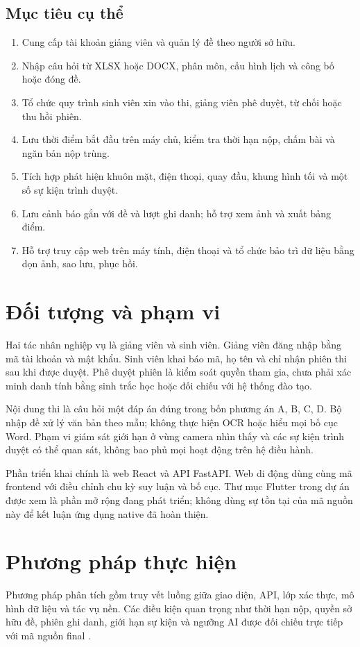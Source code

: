 \subsection{Mục tiêu cụ thể}
\begin{enumerate}
\item Cung cấp tài khoản giảng viên và quản lý đề theo người sở hữu.
\item Nhập câu hỏi từ XLSX hoặc DOCX, phân môn, cấu hình lịch và công bố hoặc đóng đề.
\item Tổ chức quy trình sinh viên xin vào thi, giảng viên phê duyệt, từ chối hoặc thu hồi phiên.
\item Lưu thời điểm bắt đầu trên máy chủ, kiểm tra thời hạn nộp, chấm bài và ngăn bản nộp trùng.
\item Tích hợp phát hiện khuôn mặt, điện thoại, quay đầu, khung hình tối và một số sự kiện trình duyệt.
\item Lưu cảnh báo gắn với đề và lượt ghi danh; hỗ trợ xem ảnh và xuất bảng điểm.
\item Hỗ trợ truy cập web trên máy tính, điện thoại và tổ chức bảo trì dữ liệu bằng dọn ảnh, sao lưu, phục hồi.
\end{enumerate}

\section{Đối tượng và phạm vi}
Hai tác nhân nghiệp vụ là giảng viên và sinh viên. Giảng viên đăng nhập bằng mã tài khoản và mật khẩu. Sinh viên khai báo mã, họ tên và chỉ nhận phiên thi sau khi được duyệt. Phê duyệt phiên là kiểm soát quyền tham gia, chưa phải xác minh danh tính bằng sinh trắc học hoặc đối chiếu với hệ thống đào tạo.

Nội dung thi là câu hỏi một đáp án đúng trong bốn phương án A, B, C, D. Bộ nhập đề xử lý văn bản theo mẫu; không thực hiện OCR hoặc hiểu mọi bố cục Word. Phạm vi giám sát giới hạn ở vùng camera nhìn thấy và các sự kiện trình duyệt có thể quan sát, không bao phủ mọi hoạt động trên hệ điều hành.

Phần triển khai chính là web React và API FastAPI. Web di động dùng cùng mã frontend với điều chỉnh chu kỳ suy luận và bố cục. Thư mục Flutter trong dự án được xem là phần mở rộng đang phát triển; không dùng sự tồn tại của mã nguồn này để kết luận ứng dụng native đã hoàn thiện.

\section{Phương pháp thực hiện}
Phương pháp phân tích gồm truy vết luồng giữa giao diện, API, lớp xác thực, mô hình dữ liệu và tác vụ nền. Các điều kiện quan trọng như thời hạn nộp, quyền sở hữu đề, phiên ghi danh, giới hạn sự kiện và ngưỡng AI được đối chiếu trực tiếp với mã nguồn final \cite{repo}.

